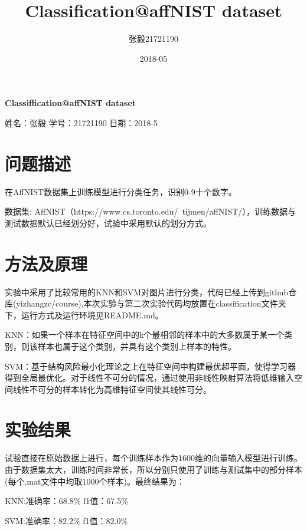 \documentclass[a4paper]{article}
\title{Classification@affNIST dataset}
\date{2018-05}
\author{张毅\hspace{1em}21721190}
\begin{document}
    
    \begin{center}
        \doublespacing
        
        \Large \textbf{Classiffication@affNIST dataset}

        \normalsize 姓名：张毅 \qquad 学号：21721190 \qquad 日期：2018-5
    \end{center}

    \section{问题描述}

    在AffNIST数据集上训练模型进行分类任务，识别0-9十个数字。

    数据集: AffNIST（https://www.cs.toronto.edu/~tijmen/affNIST/），训练数据与测试数据默认已经划分好，试验中采用默认的划分方式。

    \section{方法及原理}

    实验中采用了比较常用的KNN和SVM对图片进行分类，代码已经上传到github仓库(yizhangzc/course),本次实验与第二次实验代码均放置在classification文件夹下，运行方式及运行环境见README.md。
    
    KNN：如果一个样本在特征空间中的k个最相邻的样本中的大多数属于某一个类别，则该样本也属于这个类别，并具有这个类别上样本的特性。

    SVM：基于结构风险最小化理论之上在特征空间中构建最优超平面，使得学习器得到全局最优化。对于线性不可分的情况，通过使用非线性映射算法将低维输入空间线性不可分的样本转化为高维特征空间使其线性可分。

    \section{实验结果}

    试验直接在原始数据上进行，每个训练样本作为1600维的向量输入模型进行训练。由于数据集太大，训练时间非常长，所以分别只使用了训练与测试集中的部分样本(每个.mat文件中均取1000个样本)。最终结果为：

        \begin{center}
            KNN:\qquad 准确率：68.8\% \qquad f1值：67.5\%

            SVM:\qquad 准确率：82.2\% \qquad f1值：82.0\%
        \end{center}
\end{document}
